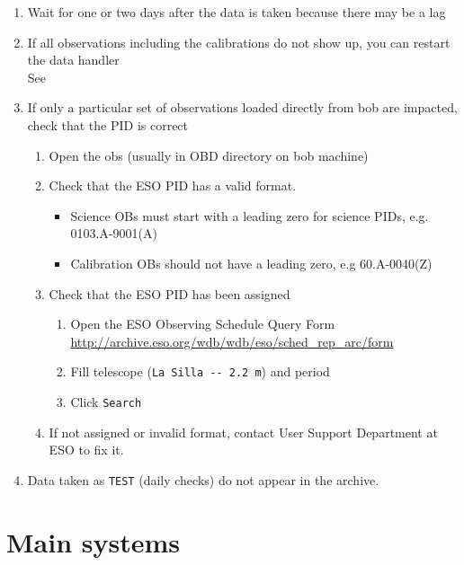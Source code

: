 \documentclass[11pt,fleqn,a4paper]{book}
\begin{document}
\begin{enumerate}
   \item Wait for one or two days after the data is taken because there may be a lag
   \item If all observations including the calibrations do not show up,
         you can restart the data handler\\
         See 
   \item If only a particular set of observations loaded directly from bob
         are impacted, check that the PID is correct
         \begin{enumerate}
           \item Open the \glspl{ob} (usually in OBD directory on bob machine)
           \item Check that the ESO PID has a valid format.
           \begin{itemize}
               \item Science OBs must start with a leading
                 zero for science PIDs, e.g. 0103.A-9001(A)
               \item Calibration OBs should not have a leading zero, e.g 60.A-0040(Z) 
           \end{itemize}
           \item Check that the ESO PID has been assigned 
              \begin{enumerate}
                \item Open the ESO Observing Schedule Query Form\\
                      \url{http://archive.eso.org/wdb/wdb/eso/sched\_rep\_arc/form}
                \item Fill telescope (\texttt{La Silla -{}- 2.2 m}) and period 
                \item Click \texttt{Search}
              \end{enumerate}
           \item If not assigned or invalid format, contact User Support Department at ESO to fix it.
     \end{enumerate}
   \item Data taken as \texttt{TEST} (daily checks) do not appear in the archive.
\end{enumerate}




\chapter{Main systems}
\label{chap:compo}
\end{document}
